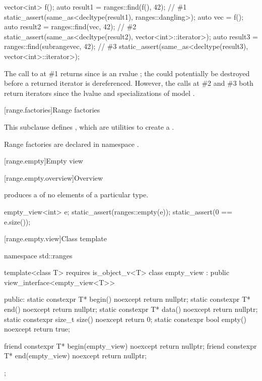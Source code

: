 \pnum
\begin{example}
\begin{codeblock}
vector<int> f();
auto result1 = ranges::find(f(), 42);                                   // \#1
static_assert(same_as<decltype(result1), ranges::dangling>);
auto vec = f();
auto result2 = ranges::find(vec, 42);                                   // \#2
static_assert(same_as<decltype(result2), vector<int>::iterator>);
auto result3 = ranges::find(subrange{vec}, 42);                         // \#3
static_assert(same_as<decltype(result3), vector<int>::iterator>);
\end{codeblock}
The call to  at \#1 returns 
since  is an rvalue ;
the  could potentially be destroyed
before a returned iterator is dereferenced.
However, the calls at \#2 and \#3 both return iterators
since the lvalue  and specializations of 
model .
\end{example}

[range.factories]{Range factories}

\pnum
This subclause defines ,
which are utilities to create a .

\pnum
Range factories are declared in namespace .

[range.empty]{Empty view}

[range.empty.overview]{Overview}

\pnum
{} produces a  of no elements of
a particular type.

\pnum
\begin{example}
\begin{codeblock}
empty_view<int> e;
static_assert(ranges::empty(e));
static_assert(0 == e.size());
\end{codeblock}
\end{example}

[range.empty.view]{Class template }

%
\begin{codeblock}
namespace std::ranges {
  template<class T>
    requires is_object_v<T>
  class empty_view : public view_interface<empty_view<T>> {
  public:
    static constexpr T* begin() noexcept { return nullptr; }
    static constexpr T* end() noexcept { return nullptr; }
    static constexpr T* data() noexcept { return nullptr; }
    static constexpr size_t size() noexcept { return 0; }
    static constexpr bool empty() noexcept { return true; }

    friend constexpr T* begin(empty_view) noexcept { return nullptr; }
    friend constexpr T* end(empty_view) noexcept { return nullptr; }
  };
}
\end{codeblock}

